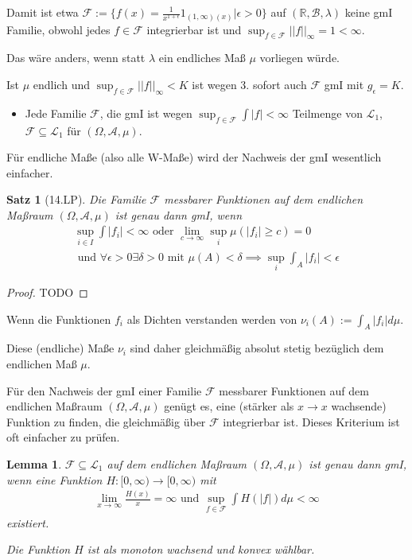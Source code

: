 \documentclass[]{article}
\newtheorem{theorem}{Satz}
\newtheorem{lemma}{Lemma}
\begin{document}
Damit ist etwa $\mathcal{F}:= \{f(x)=\frac{1}{x^{1+\epsilon}} 1_{(1,\infty)(x)} | \epsilon > 0\}$ auf $(\mathbb{R}, \mathcal{B}, \lambda)$ keine gmI Familie, obwohl jedes $f \in \mathcal{F}$ integrierbar ist und $\sup_{f\in\mathcal{F}} ||f||_\infty = 1 < \infty$.

Das wäre anders, wenn statt $\lambda$ ein endliches Maß $\mu$ vorliegen würde.

Ist $\mu$ endlich und $\sup_{f\in\mathcal{F}} ||f||_\infty < K$ ist wegen 3. sofort auch $\mathcal{F}$ gmI mit $g_\epsilon = K$.

\begin{itemize}
	\item Jede Familie $\mathcal{F}$, die gmI ist wegen $\sup_{f\in\mathcal{F}} \int |f| < \infty$ Teilmenge von $\mathcal{L}_1$, $\mathcal{F} \subseteq \mathcal{L}_1$ für $(\Omega, \mathcal{A}, \mu)$.
\end{itemize}

Für endliche Maße (also alle W-Maße) wird der Nachweis der gmI wesentlich einfacher.

\begin{theorem}[14.LP]
	Die Familie $\mathcal{F}$ messbarer Funktionen auf dem endlichen Maßraum $(\Omega, \mathcal{A}, \mu)$ ist genau dann gmI, wenn
	\begin{align*}
		\sup_{i\in I} \int |f_i| < \infty \text{ oder } \lim\limits_{c\rightarrow\infty} \sup_i \mu(|f_i| \geq c) = 0 \\
		\text{ und } \forall \epsilon > 0 \exists \delta > 0 \text{ mit } \mu(A) < \delta \implies \sup_i \int_A |f_i| < \epsilon
	\end{align*}
\end{theorem}

\begin{proof}
	TODO
\end{proof}

Wenn die Funktionen $f_i$ als Dichten verstanden werden von $\nu_i(A) := \int_A |f_i| d\mu$.

Diese (endliche) Maße $\nu_i$ sind daher gleichmäßig absolut stetig bezüglich dem endlichen Maß $\mu$.

Für den Nachweis der gmI einer Familie $\mathcal{F}$ messbarer Funktionen auf dem endlichen Maßraum $(\Omega, \mathcal{A}, \mu)$ genügt es, eine (stärker als $x\rightarrow x$ wachsende) Funktion zu finden, die gleichmäßig über $\mathcal{F}$ integrierbar ist. Dieses Kriterium ist oft einfacher zu prüfen.

\begin{lemma}
	$\mathcal{F} \subseteq \mathcal{L}_1$ auf dem endlichen Maßraum $(\Omega, \mathcal{A}, \mu)$ ist genau dann gmI, wenn eine Funktion $H:[0, \infty) \rightarrow [0, \infty)$ mit
	\begin{align*}
		\lim_{x\rightarrow\infty} \frac{H(x)}{x} = \infty \text{ und } \sup_{f\in\mathcal{F}} \int H(|f|) d\mu < \infty
	\end{align*}
	existiert.
	
	Die Funktion $H$ ist als monoton wachsend und konvex wählbar.
\end{lemma}
\end{document}
